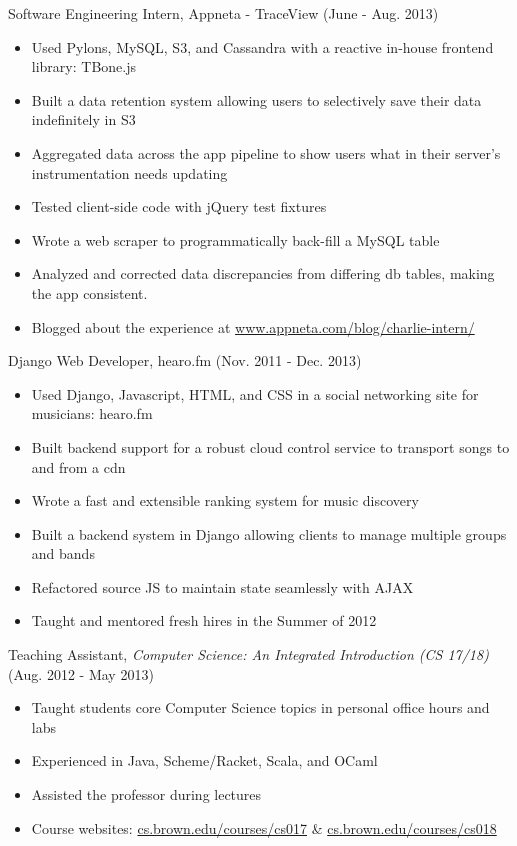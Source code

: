 \documentclass[11pt]{res} %
\begin{document}
\begin{resume}
Software Engineering Intern,
Appneta - TraceView
(June - Aug. 2013)
\vspace{0.02in}
   \begin{itemize} \itemsep -2pt
   \item Used Pylons, MySQL, S3, and Cassandra with a reactive in-house frontend library: TBone.js
   \item Built a data retention system allowing users to selectively save their data indefinitely in S3
   \item Aggregated data across the app pipeline to show users what in their server's instrumentation needs updating
   \item Tested client-side code with jQuery test fixtures
   \item Wrote a web scraper to programmatically back-fill a MySQL table
   \item Analyzed and corrected data discrepancies from differing db tables, making the app consistent.
   \item Blogged about the experience at \href{http://www.appneta.com/blog/charlie-intern/}{www.appneta.com/blog/charlie-intern/}
   \end{itemize}

Django Web Developer,
hearo.fm
(Nov. 2011 - Dec. 2013)
\vspace{0.02in}
   \begin{itemize} \itemsep -2pt
   \item Used Django, Javascript, HTML, and CSS in a social networking site for musicians: hearo.fm
   \item Built backend support for a robust cloud control service to transport songs to and from a cdn
   \item Wrote a fast and extensible ranking system for music discovery
   \item Built a backend system in Django allowing clients to manage multiple groups and bands
   \item Refactored source JS to maintain state seamlessly with AJAX
   \item Taught and mentored fresh hires in the Summer of 2012
   \end{itemize}

Teaching Assistant, \emph{Computer Science: An Integrated Introduction (CS 17/18)}\\
(Aug. 2012 - May 2013)
\vspace{0.02in}
   \begin{itemize} \itemsep -2pt
   \item Taught students core Computer Science topics in personal office hours and labs
   \item Experienced in Java, Scheme/Racket, Scala, and OCaml
   \item Assisted the professor during lectures
   \item Course websites:
      \href{http://cs.brown.edu/courses/cs017}{cs.brown.edu/courses/cs017} \&
      \href{http://cs.brown.edu/courses/cs018}{cs.brown.edu/courses/cs018}

   \end{itemize}

\end{resume}
\end{document}
